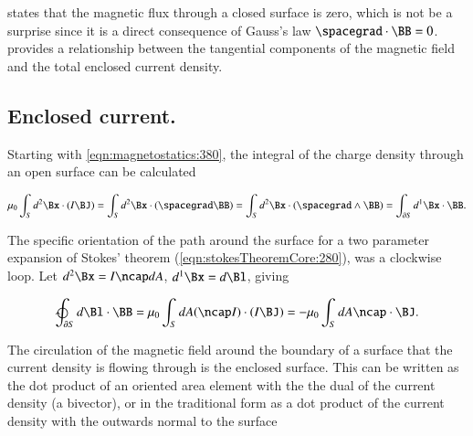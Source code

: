  states that the magnetic flux through a closed surface is zero, which is not be a surprise since it is a direct consequence of Gauss's law \( \spacegrad \cdot \BB = 0 \).
 provides a relationship between the tangential components of the magnetic field and the total enclosed current density.

\subsection{Enclosed current.}

Starting with
\cref{eqn:magnetostatics:380}, the
integral of the
charge density through an open surface can be calculated

\begin{dmath}\label{eqn:magnetostatics:720}
\mu_0 \int_S d^2 \Bx \cdot (I \BJ)
=
\int_S d^2 \Bx \cdot (\spacegrad \BB)
=
\int_S d^2 \Bx \cdot (\spacegrad \wedge \BB)
=
\int_{\partial S} d^1 \Bx \cdot \BB.
\end{dmath}

The specific orientation of the path around the surface for a two parameter expansion of Stokes' theorem (\cref{eqn:stokesTheoremCore:280}), was a clockwise loop.
Let
\( d^2 \Bx = I \ncap dA \), \( d^1 \Bx = d\Bl \), giving

\begin{dmath}\label{eqn:magnetostatics:740}
\ointclockwise_{\partial S} d\Bl \cdot \BB
= \mu_0 \int_S dA (\ncap I) \cdot (I \BJ)
= -\mu_0 \int_S dA \ncap \cdot \BJ.
\end{dmath}

The circulation of the magnetic field around the boundary of a surface that the current density is flowing through is the enclosed surface.
This can be written as the dot product of an oriented area element with the the dual of the current density (a bivector), or in the traditional form as a dot product of the current density with the outwards normal to the surface



